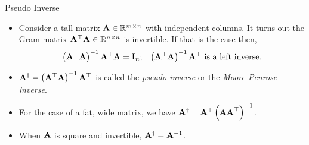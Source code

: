 \documentclass[aspectratio=169]{beamer}
\let\olditem\item
\renewcommand{\item}{\setlength{\itemsep}{\fill}\olditem}
\def\mf{\ensuremath\mathbf}
\def\mb{\ensuremath\mathbb}
\def\lV{\ensuremath\left\lVert}
\def\rV{\ensuremath\right\rVert}
\begin{document}
\begin{frame}[t]{Pseudo Inverse}
\begin{itemize}
    \item Consider a tall matrix $\mf{A} \in \mb{R}^{m \times n}$ with independent columns. It turns out the Gram matrix $\mf{A}^\top\mf{A} \in \mb{R}^{n \times n}$ is invertible. If that is the case then,
    \[ \left(\mf{A}^\top\mf{A}\right)^{-1}\mf{A}^\top\mf{A} = \mf{I}_n; \,\,\,\,\, \left(\mf{A}^\top\mf{A}\right)^{-1}\mf{A}^\top \text{ is a left inverse.} \]
    \item $\mf{A}^{\dagger} = \left(\mf{A}^\top\mf{A}\right)^{-1}\mf{A}^\top$ is called the \textit{pseudo inverse} or the \textit{Moore-Penrose inverse}.

    \item For the case of a fat, wide matrix, we have $\mf{A}^{\dagger} = \mf{A}^\top\left(\mf{AA}^\top\right)^{-1}$.

    \item When $\mf{A}$ is square and invertible, $\mf{A}^{\dagger} = \mf{A}^{-1}$.
\end{itemize}
\end{frame}






\end{document}
